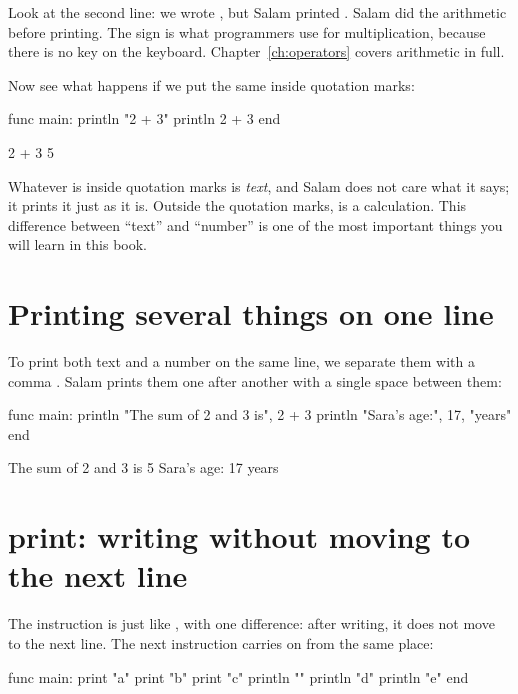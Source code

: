 Look at the second line: we wrote , but Salam printed .
Salam did the arithmetic before printing. The sign \code{*} is what
programmers use for multiplication, because there is no \texttimes{} key on
the keyboard. Chapter~\ref{ch:operators} covers arithmetic in full.

Now see what happens if we put the same  inside quotation marks:

\begin{salamcode}
func main:
    println "2 + 3"
    println 2 + 3
end
\end{salamcode}

\begin{salamout}
2 + 3
5
\end{salamout}

Whatever is inside quotation marks is \emph{text}, and Salam does not care
what it says; it prints it just as it is. Outside the quotation marks,
 is a calculation. This difference between ``text'' and
``number'' is one of the most important things you will learn in this book.

\section{Printing several things on one line}

To print both text and a number on the same line, we separate them with a
comma \code{,}. Salam prints them one after another with a single space
between them:

\begin{salamcode}
func main:
    println "The sum of 2 and 3 is", 2 + 3
    println "Sara's age:", 17, "years"
end
\end{salamcode}

\begin{salamout}
The sum of 2 and 3 is 5
Sara's age: 17 years
\end{salamout}

\section{print: writing without moving to the next line}

The instruction  is just like , with one
difference: after writing, it does not move to the next line. The next
instruction carries on from the same place:

\begin{salamcode}
func main:
    print "a"
    print "b"
    print "c"
    println ""
    println "d"
    println "e"
end
\end{salamcode}

